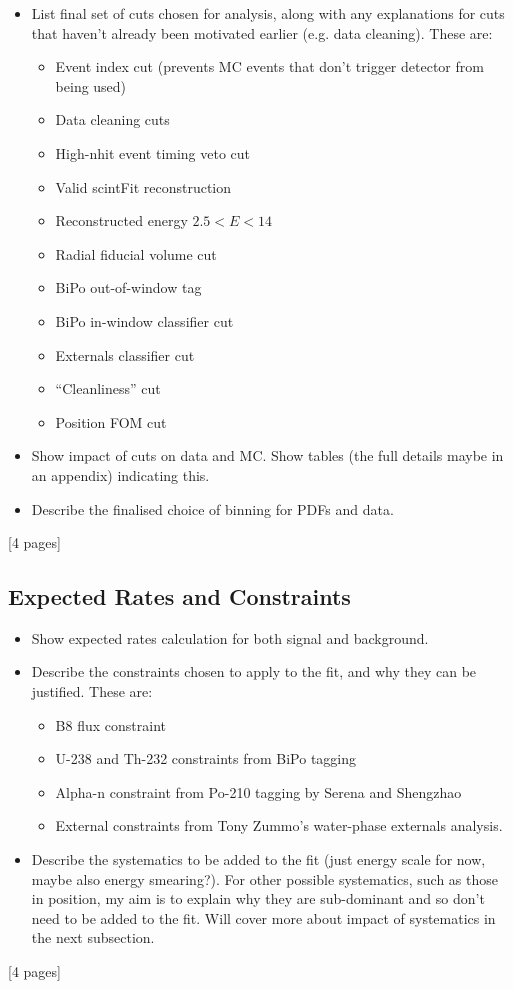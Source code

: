 {
    \color{blue}
    \begin{itemize}
        \item List final set of cuts chosen for analysis, along with any explanations for cuts that haven't already been motivated earlier (e.g. data cleaning). These are:
        \begin{itemize}
            \item Event index cut (prevents MC events that don't trigger detector from being used)
            \item Data cleaning cuts
            \item High-nhit event timing veto cut
            \item Valid scintFit reconstruction
            \item Reconstructed energy $2.5 < E < 14$
            \item Radial fiducial volume cut
            \item BiPo out-of-window tag
            \item BiPo in-window classifier cut
            \item Externals classifier cut
            \item ``Cleanliness'' cut
            \item Position FOM cut
        \end{itemize}
        \item Show impact of cuts on data and MC. Show tables (the full details maybe in an appendix) indicating this.
        \item Describe the finalised choice of binning for PDFs and data.
    \end{itemize}
    [4 pages]
    \subsection{Expected Rates and Constraints}\label{sec:exp_rates_constraints}
    \begin{itemize}
        \item Show expected rates calculation for both signal and background.
        \item Describe the constraints chosen to apply to the fit, and why they can be justified. These are: 
        \begin{itemize}
            \item B8 flux constraint
            \item U-238 and Th-232 constraints from BiPo tagging
            \item Alpha-n constraint from Po-210 tagging by Serena and Shengzhao
            \item External constraints from Tony Zummo's water-phase externals analysis.
        \end{itemize}
        \item Describe the systematics to be added to the fit (just energy scale for now, maybe also energy smearing?). For other possible systematics, such as those in position, my aim is to explain why they are sub-dominant and so don't need to be added to the fit. Will cover more about impact of systematics in the next subsection.
    \end{itemize}
    [4 pages]
}
